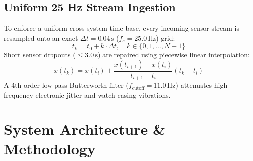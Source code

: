 \documentclass[11pt,a4paper]{article}
\begin{document}
\subsection{Uniform 25 Hz Stream Ingestion}
To enforce a uniform cross-system time base, every incoming sensor stream is resampled onto an exact $\Delta t = 0.04\,\text{s}$ ($f_s = 25.0\,\text{Hz}$) grid:
\begin{equation}
t_k = t_0 + k \cdot \Delta t, \quad k \in \{0, 1, \dots, N-1\}
\end{equation}
Short sensor dropouts ($\le 3.0\,\text{s}$) are repaired using piecewise linear interpolation:
\begin{equation}
x(t_k) = x(t_i) + \frac{x(t_{i+1}) - x(t_i)}{t_{i+1} - t_i} (t_k - t_i)
\end{equation}
A 4th-order low-pass Butterworth filter ($f_{\text{cutoff}} = 11.0\,\text{Hz}$) attenuates high-frequency electronic jitter and watch casing vibrations.

\section{System Architecture \& Methodology}
\end{document}
